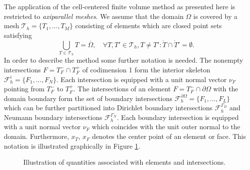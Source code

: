 \documentclass[a4paper,12pt]{article}
\begin{document}
The application of the cell-centered finite volume method as presented here is
restricted to \textit{axiparallel meshes}. We assume that  the domain $\Omega$ is covered by a mesh
$\mathcal{T}_h = \{T_1, \ldots, T_M\}$ consisting of elements
which are closed point sets satisfying
\begin{equation}
\bigcup_{T\in \mathcal{T}_h} T = \overline{\Omega}, \quad 
\forall T, T' \in \mathcal{T}_h, T\neq T' : \mathring{T} \cap \mathring{T}' = \emptyset .
\end{equation}
In order to describe the method some further notation is needed.
The nonempty intersections $F = T_F^-\cap T_F^+$ 
of codimension 1 form the interior skeleton $\mathcal{F}_h^i=\{F_1,\ldots,F_N\}$.
Each intersection is equipped with a unit normal vector $\nu_F$ pointing from $T_F^-$ to $T_F^+$.
The intersections of an element $F=T_F^-\cap\partial\Omega$ with the domain
boundary form the set of boundary intersections $\mathcal{F}_h^{\partial\Omega}=
\{F_1,\ldots,F_L\}$ which can be further partitioned into
Dirichlet boundary intersections $\mathcal{F}_h^{\Gamma_D}$
and Neumann boundary intersections $\mathcal{F}_h^{\Gamma_N}$.
Each boundary intersection is equipped with a unit normal vector
$\nu_F$ which coincides with the unit outer normal to the domain. 
Furthermore, $x_T$, $x_F$ denotes the center point of an element or face.
This notation is illustrated graphically in Figure \ref{fig:MeshNotation}.

\begin{figure}
\begin{center}
\hspace{0.1\textwidth}
\end{center}
\caption{Illustration of quantities associated with elements and intersections.}
\label{fig:MeshNotation}
\end{figure}
\end{document}
